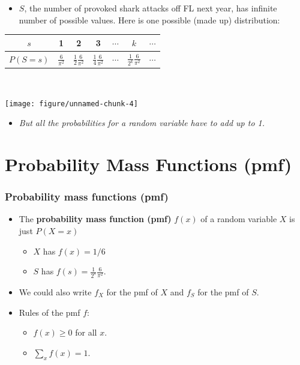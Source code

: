 \documentclass[handout]{beamer}\usepackage{graphicx, color}
\newenvironment{knitrout}{}{} %
\providecommand{\q}{$\quad$ \newline}
\numberwithin{equation}{section}
\begin{document}
\begin{frame}
\begin{itemize}
\item $S$, the number of provoked shark attacks off FL next year, has infinite number of possible values. Here is one possible (made up) distribution: \q \q
\end{itemize}
\begin{tabular}{ccccccc}
$s$ & 1 & 2 & 3 & $\cdots$ & $k$ & $\cdots$ \\ \hline
$P(S = s)$ & $\frac{6}{\pi^2}$ & $\frac{1}{2} \frac{6}{\pi^2}$ & $\frac{1}{4} \frac{6}{\pi^2}$ & $\cdots$ & $\frac{1}{2^k} \frac{6}{\pi^2}$ & $\cdots$ \\ 
\end{tabular}\q

\begin{center}
\begin{knitrout}
\color{fgcolor}
\texttt{[image: figure/unnamed-chunk-4]} 

\end{knitrout}

\end{center}
\begin{itemize}
\item \emph{But all the probabilities for a random variable have to add up to 1.}
\end{itemize}
\end{frame}

\section{Probability Mass Functions (pmf)}

\begin{frame}
\frametitle{Probability mass functions (pmf)}
\begin{itemize}
\pause \item The {\bf probability mass function (pmf)} $f(x)$ of a random variable $X$ is just $P(X = x)$
\begin{itemize}
\pause \item $X$ has $f(x) = 1/6$
\pause \item $S$ has $f(s) = \frac{1}{2^s} \frac{6}{\pi^2}$.
\end{itemize}
\pause \item We could also write $f_X$ for the pmf of $X$ and $f_S$ for the pmf of $S$. 
\pause \item \color{blue} Rules of the pmf $f$:
\begin{itemize}
\pause \item \color{blue} $f(x) \ge 0$ for all $x$.
\pause \item \color{blue} $\sum_x f(x) = 1$. 
\end{itemize}
\end{itemize}
\color{black}
\end{frame}
\end{document}
